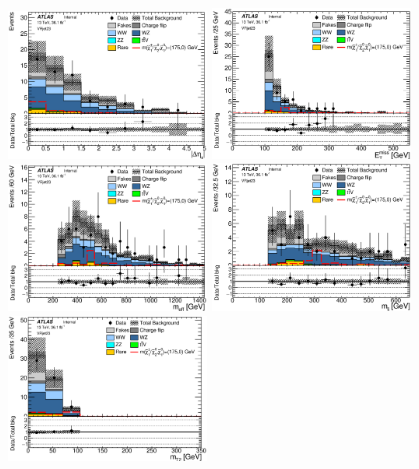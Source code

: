 \begin{figure}[htbp]
\centering
\includegraphics[width=0.47\textwidth]{data/plot/VR/all_DEtall_VRjet23.eps}
\includegraphics[width=0.47\textwidth]{data/plot/VR/all_Met_VRjet23.eps} \\
\includegraphics[width=0.47\textwidth]{data/plot/VR/all_Meff_VRjet23.eps}
\includegraphics[width=0.47\textwidth]{data/plot/VR/all_Mlj_VRjet23.eps} \\
\includegraphics[width=0.47\textwidth]{data/plot/VR/all_Mt2_VRjet23.eps}

\end{figure}
